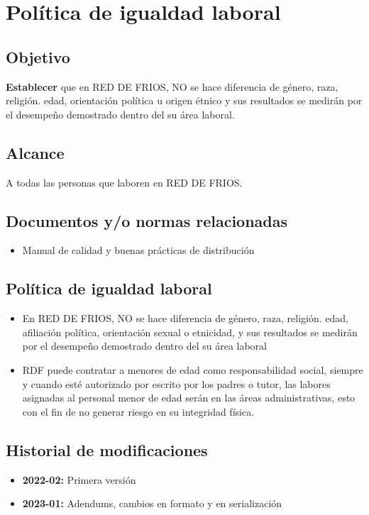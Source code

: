 \renewcommand{\Codigo}{BPD-PROG}
\renewcommand{\FechaPub}{2023-01}
\renewcommand{\Edit}{03}
\renewcommand{\Titulo}{Política de igualdad laboral}
\section{\Titulo}



\subsection{Objetivo}

\textbf{Establecer} que en RED DE FRIOS, NO se hace diferencia de género, raza, religión. edad, orientación política u origen étnico y sus resultados se medirán por el desempeño demostrado dentro del su área laboral.

\subsection{Alcance}

A todas las personas que laboren en RED DE FRIOS.

\subsection{Documentos y/o normas relacionadas}

\begin{itemize}
	\item Manual de calidad y buenas prácticas de distribución
\end{itemize}

\subsection{Política de igualdad laboral}

\begin{itemize}
	\item En RED DE FRIOS, NO se hace diferencia de género, raza, religión. edad, afiliación política, orientación sexual o etnicidad, y sus resultados se medirán por el desempeño demostrado dentro del su área laboral
	\item RDF puede contratar a menores de edad como responsabilidad social, siempre y cuando esté autorizado por escrito por los padres o tutor, las labores asignadas al personal menor de edad serán en las áreas administrativas, esto con el fin de no generar riesgo en su integridad física.
\end{itemize}

\subsection{Historial de modificaciones}

\begin{itemize}
	\item \textbf{2022-02:} Primera versión
	\item \textbf{2023-01:} Adendums, cambios en formato y en serialización
\end{itemize}
